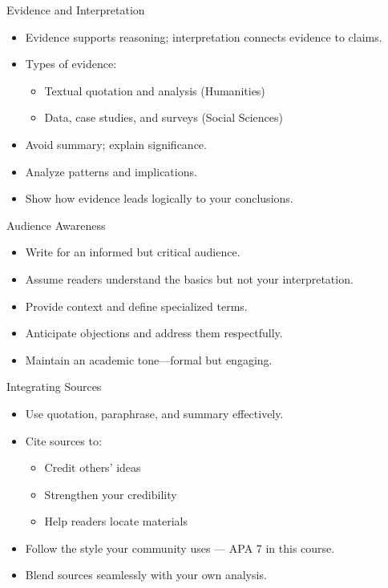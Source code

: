 \documentclass[aspectratio=169]{beamer}
\begin{document}
\begin{frame}{Evidence and Interpretation}
\begin{itemize}
  \item Evidence supports reasoning; interpretation connects evidence to claims.
  \item Types of evidence:
    \begin{itemize}
      \item Textual quotation and analysis (Humanities)
      \item Data, case studies, and surveys (Social Sciences)
    \end{itemize}
  \item Avoid summary; explain significance.
  \item Analyze patterns and implications.
  \item Show how evidence leads logically to your conclusions.
\end{itemize}
\end{frame}

\begin{frame}{Audience Awareness}
\begin{itemize}
  \item Write for an informed but critical audience.
  \item Assume readers understand the basics but not your interpretation.
  \item Provide context and define specialized terms.
  \item Anticipate objections and address them respectfully.
  \item Maintain an academic tone—formal but engaging.
\end{itemize}
\end{frame}

\begin{frame}{Integrating Sources}
\begin{itemize}
  \item Use quotation, paraphrase, and summary effectively.
  \item Cite sources to:
    \begin{itemize}
      \item Credit others’ ideas
      \item Strengthen your credibility
      \item Help readers locate materials
    \end{itemize}
  \item Follow the style your community uses --- APA 7 in this course.
  \item Blend sources seamlessly with your own analysis.
\end{itemize}
\end{frame}
\end{document}
